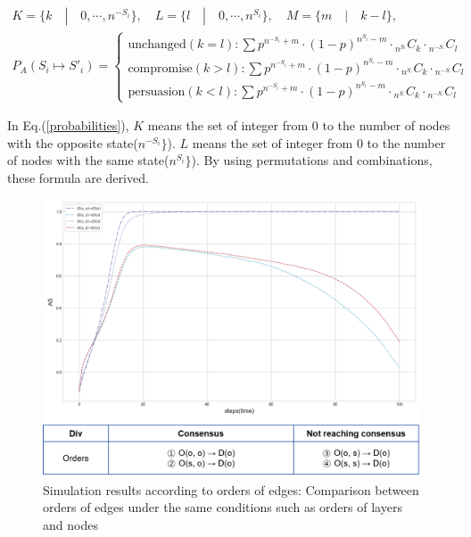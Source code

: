 \begin{equation}
\begin{array}{l}
K = \{ k \quad|\quad 0, \cdots ,{n^{ - {S_i}}}\}, \quad L = \{l \quad|\quad 0, \cdots ,{n^{{S_i}}}\},
\quad M = \{m \quad|\quad k-l\}, \\
{P_A}({S_i} \mapsto {{S'}_i}) = \begin{cases}
\mbox{unchanged}(k = l):\sum {{p^{{n^{ - {S_i}}}+m}} \cdot {{(1 - p)}^{{n^{{S_i}}}-m}} \cdot {}_{{n^{{S_{^i}}}}}{C_k} \cdot {}_{{n^{ - {S_{^i}}}}}{C_l}} \\
\mbox{compromise}(k > l):\sum {{p^{{n^{ - {S_i}}}+m}} \cdot {{(1 - p)}^{{n^{{S_i}}}-m}} \cdot {}_{{n^{{S_{^i}}}}}{C_k} \cdot {}_{{n^{ - {S_{^i}}}}}{C_l}} \\
\mbox{persuasion}(k < l):\sum {{p^{{n^{ - {S_i}}}+m}} \cdot {{(1 - p)}^{{n^{{S_i}}}-m}} \cdot {}_{{n^{{S_{^i}}}}}{C_k} \cdot {}_{{n^{ - {S_{^i}}}}}{C_l}} 
\end{cases}
\end{array}
\label{probabilities}
\end{equation}

In Eq.(\ref{probabilities}), $K$ means the set of integer from 0 to the number of nodes with the opposite state(${n^{ - {S_i}}}\}$). $L$ means the set of integer from $0$ to the number of nodes with the same state(${n^{{S_i}}}\}$). By using permutations and combinations, these formula are derived.

\begin{figure}[!htb]
	\centering
	\includegraphics[width=\hsize]{figure/chap4_edgeorder.png}
	\caption{Simulation results according to orders of edges: Comparison between orders of edges under the same conditions such as orders of layers and nodes}
	\label{edgeorder}
\end{figure}

